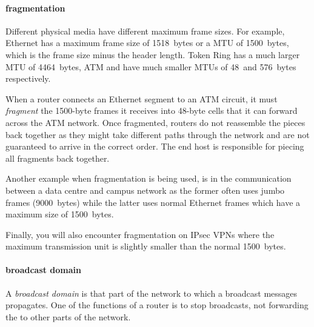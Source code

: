 \paragraph{fragmentation}
Different physical media have different maximum frame sizes.
For example, Ethernet has a maximum frame size of 1518~bytes or a \gls{MTU} of 1500~bytes, which is the frame size minus the header length.
Token Ring has a much larger \gls{MTU} of 4464~bytes, \gls{ATM} and  have much smaller \acp{MTU} of 48~and 576~bytes respectively.

When a router connects an Ethernet segment to an \gls{ATM} circuit, it must \emph{fragment} the 1500-byte frames it receives into 48-byte cells that it can forward across the \ac{ATM} network.
Once fragmented, routers do not reassemble the pieces back together as they might take different paths through the network and are not guaranteed to arrive in the correct order.
The end host is responsible for piecing all fragments back together.

Another example when fragmentation is being used, is in the communication between a data centre and campus network as the former often uses jumbo frames (9000~bytes) while the latter uses normal Ethernet frames which have a maximum size of 1500~bytes.%

Finally, you will also encounter fragmentation on IPsec \aclp{VPN} where the maximum transmission unit is slightly smaller than the normal 1500~bytes.

\paragraph{broadcast domain}
A \emph{broadcast domain} is that part of the network to which a broadcast messages propagates.
One of the functions of a router is to stop broadcasts, not forwarding the to other parts of the network.


